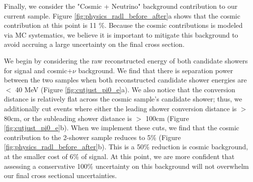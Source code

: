 

Finally, we consider the "Cosmic + Neutrino" background contribution to our current sample.  Figure \ref{fig:physics_radl_before_after}a shows that the cosmic contribution at this point is 11 \%. Because the cosmic contributions is modeled via MC systematics, we believe it is important to mitigate this background to avoid accruing a large uncertainty on the final cross section.

We begin by considering the raw reconstructed energy of both candidate showers for signal and cosmic+$\nu$ background. We find that there is separation power between the two samples when both reconstructed candidate shower energies are $<$ 40 MeV (Figure \ref{fig:cutjust_pi0_e}a).  We also notice that the conversion distance is relatively flat across the cosmic sample's candidate shower; thus, we additionally cut events where either the leading shower conversion distance is $>$ 80cm, or the subleading shower distance is $>$ 100cm (Figure \ref{fig:cutjust_pi0_e}b). When we implement these cuts, we find that the cosmic contribution to the 2-shower sample reduces to 5\% (Figure \ref{fig:physics_radl_before_after}b).  This is a 50\% reduction is cosmic background, at the smaller cost of 6\% of signal. At this point, we are more confident that assessing a conservative 100\% uncertainty on this background will not overwhelm our final cross sectional uncertainties.
 
